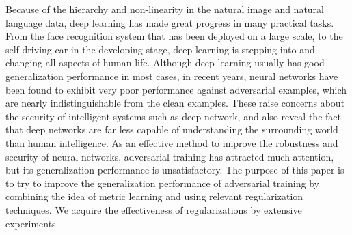 \begin{abstractEn}

Because of the hierarchy and non-linearity in the natural image and natural language data, deep learning has made great progress in many practical tasks. From the face recognition system that has been deployed on a large scale, to the self-driving car in the developing stage, deep learning is stepping into and changing all aspects of human life. Although deep learning usually has good generalization performance in most cases, in recent years, neural networks have been found to exhibit very poor performance against adversarial examples, which are nearly indistinguishable from the clean examples. These raise concerns about the security of intelligent systems such as deep network, and also reveal the fact that deep networks are far less capable of understanding the surrounding world than human intelligence. As an effective method to improve the robustness and security of neural networks, adversarial training has attracted much attention, but its generalization performance is unsatisfactory. The purpose of this paper is to try to improve the generalization performance of adversarial training by combining the idea of metric learning and using relevant regularization techniques. We acquire the effectiveness of regularizations by extensive experiments.

\end{abstractEn}



\usepackage{subfig}
\usepackage{rotating}
\usepackage[usenames,dvipsnames]{xcolor}
\usepackage{tikz}
\usepackage{pgfplots}
\pgfplotsset{compat=1.16}
\usepackage{ifthen}
\usepackage{longtable}
\usepackage{siunitx}
\usepackage{listings}
\usepackage{multirow}
\usepackage[bottom]{footmisc}
\usepackage{pifont}
\usepackage{booktabs}   %
\usepackage{hyperref}   %



